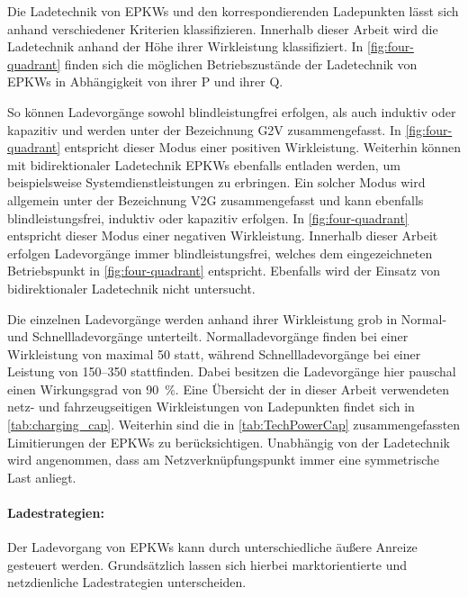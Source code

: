 Die Ladetechnik von \glspl{EPKW} und den korrespondierenden Ladepunkten lässt sich anhand verschiedener Kriterien klassifizieren.
Innerhalb dieser Arbeit wird die Ladetechnik anhand der Höhe ihrer Wirkleistung klassifiziert.
In \autoref{fig:four-quadrant} finden sich die möglichen Betriebszustände der Ladetechnik von \glspl{EPKW} in Abhängigkeit von ihrer \gls{P} und ihrer \gls{Q}.



So können Ladevorgänge sowohl blindleistungfrei erfolgen, als auch induktiv oder kapazitiv und werden unter der Bezeichnung \gls{G2V} zusammengefasst.
In \autoref{fig:four-quadrant} entspricht dieser Modus einer positiven Wirkleistung.
Weiterhin können mit bidirektionaler Ladetechnik \glspl{EPKW} ebenfalls entladen werden, um beispielsweise Systemdienstleistungen zu erbringen.
Ein solcher Modus wird allgemein unter der Bezeichnung \gls{V2G} zusammengefasst und kann ebenfalls blindleistungsfrei, induktiv oder kapazitiv erfolgen.
In \autoref{fig:four-quadrant} entspricht dieser Modus einer negativen Wirkleistung. \cite{He2020} 
Innerhalb dieser Arbeit erfolgen Ladevorgänge immer blindleistungsfrei, welches dem eingezeichneten Betriebspunkt in \autoref{fig:four-quadrant} entspricht.
Ebenfalls wird der Einsatz von bidirektionaler Ladetechnik nicht untersucht.\medskip

Die einzelnen Ladevorgänge werden anhand ihrer Wirkleistung grob in Normal- und Schnellladevorgänge unterteilt.
Normalladevorgänge finden bei einer Wirkleistung von maximal \SI{50}{\kw} statt, während Schnellladevorgänge bei einer Leistung von \SIrange[range-phrase=~{oder}~]{150}{350}{\kw} stattfinden.
Dabei besitzen die Ladevorgänge hier pauschal einen Wirkungsgrad von \SI{90}{\percent}.
Eine Übersicht der in dieser Arbeit verwendeten netz- und fahrzeugseitigen Wirkleistungen von Ladepunkten findet sich in \autoref{tab:charging_cap}.
Weiterhin sind die in \autoref{tab:TechPowerCap} zusammengefassten Limitierungen der \glspl{EPKW} zu berücksichtigen.
Unabhängig von der Ladetechnik wird angenommen, dass am Netzverknüpfungspunkt immer eine symmetrische Last anliegt.




\paragraph{Ladestrategien:}

Der Ladevorgang von \glspl{EPKW} kann durch unterschiedliche äußere Anreize gesteuert werden.
Grundsätzlich lassen sich hierbei marktorientierte und netzdienliche Ladestrategien unterscheiden.


